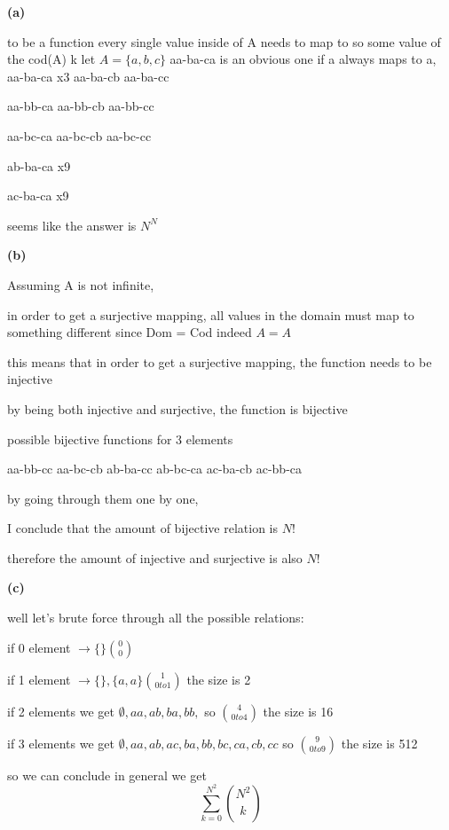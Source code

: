 \documentclass[12pts,A4]{article}
\begin{document}
\begin{flushleft}
    \textbf{(a)}


    to be a function every single value inside of A needs to map to so
    some value of the cod(A)
k
    let $A = \{ a,b,c \}$
    aa-ba-ca is an obvious one
    if a always maps to a,
    aa-ba-ca x3
    aa-ba-cb
    aa-ba-cc

    aa-bb-ca
    aa-bb-cb
    aa-bb-cc
    
    aa-bc-ca
    aa-bc-cb
    aa-bc-cc
    

    ab-ba-ca
    x9

    ac-ba-ca
    x9
    
    seems like the answer is $N^{N}$
    \bigskip

    \textbf{(b)}

    Assuming A is not infinite,


    in order to get a surjective mapping, all values in the domain
    must map to something different since Dom = Cod indeed $A = A$

    this means that in order to get a surjective mapping, the function
    needs to be injective
    
    by being both injective and surjective, the function is bijective
    
    possible bijective functions for 3 elements

    aa-bb-cc aa-bc-cb ab-ba-cc ab-bc-ca ac-ba-cb ac-bb-ca 

    by going through them one by one, 
    
    I conclude that the amount of bijective relation is $N!$

    therefore the amount of injective and surjective is also $N!$

    \bigskip
    
    \textbf{(c)}
    
    well let's brute force through all the possible relations:

    if 0 element $\rightarrow \{\} \binom{0}{0}$

    if 1 element $\rightarrow \{\} , \{a,a\} \binom{1} {0 to 1} $ the size is 2

    if 2 elements we get $ \emptyset , aa , ab, ba, bb, $ so $ \binom{4} {0 to 4} $ the size is 16

    if 3 elements we get $ \emptyset, aa , ab, ac, ba, bb, bc, ca, cb, cc $ so $ \binom{9} {0 to 9}$ the size is 512

    so we can conclude in general we get 
    $$\sum_{k=0}^{N^{2}} \binom{N^{2}} {k} $$ 


\end{flushleft}
\end{document}
